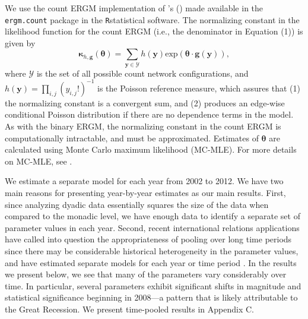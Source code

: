 \documentclass[reqno,onecolumn,letterpaper,12pt]{article}
\newcommand\citeapos[1]{\citeauthor{#1}'s (\citeyear{#1})}
\newcommand{\R}{\texttt{R}} %
\begin{document}
We use the count ERGM implementation of \citeapos{krivitsky2012exponential} made available in the \texttt{ergm.count} \citep{ergmcount} package in the \R \space statistical software. The normalizing constant in the likelihood function for the count ERGM (i.e., the denominator in Equation (1)) is given by $$ \bm{\kappa}_{h,\bm{g}}(\bm{\theta}) =  \sum_{\bm{y} \in \bm{\mathcal{Y} } }  h(\bm{y})\text{exp}( \bm {\theta} \cdot \bm{g} (\bm{y}) ), $$ where $\bm{\mathcal{Y} }$ is the set of all possible count network configurations, and $h(\bm{y}) = \prod_{i,j} (y_{i,j}!)^{-1}$ is the Poisson reference measure, which assures that (1) the normalizing constant is a convergent sum, and (2) produces an edge-wise conditional Poisson distribution if there are no dependence terms in the model. As with the binary ERGM, the normalizing constant in the count ERGM is computationally intractable, and must be approximated. Estimates of $\bm {\theta} $ are calculated using Monte Carlo maximum likelihood (MC-MLE). For more details on MC-MLE, see  \citet{snijders2002markov}. %


We estimate a separate model for each year from 2002 to 2012. We have two main reasons for presenting year-by-year estimates as our main results. First, since analyzing dyadic data essentially squares the size of the data when compared to the monadic level, we have enough data to identify a separate set of parameter values in each year. Second, recent international relations applications have called into question the appropriateness of pooling over long time periods since there may be considerable historical heterogeneity in the parameter values, and have estimated separate models for each year or time period  \citep[see,~e.g.,][]{cranmer2014reciprocity,ward2007persistent}. In the results we present below, we see that many of the parameters vary considerably over time. In particular, several parameters exhibit significant shifts in magnitude and statistical significance beginning in 2008---a pattern that is likely attributable to the Great Recession. %
We present time-pooled results in Appendix C.
\end{document}
